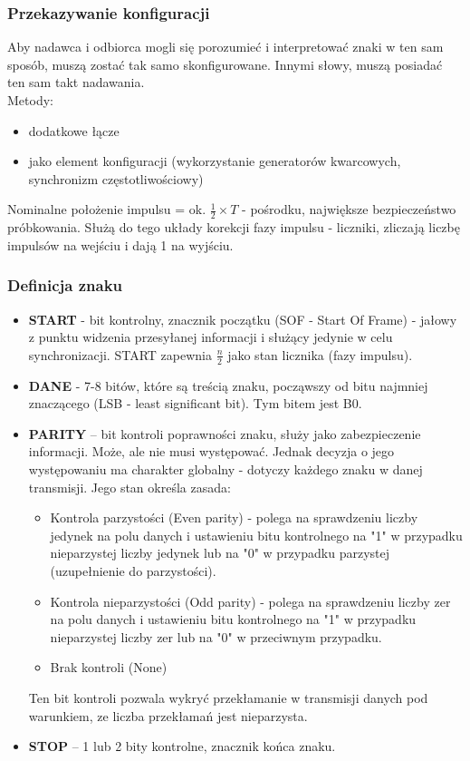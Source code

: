 \documentclass[a4paper,twoside]{article}
\begin{document}
		\subsubsection{Przekazywanie konfiguracji}
			Aby nadawca i odbiorca mogli się porozumieć i interpretować znaki w ten sam sposób, muszą zostać tak samo skonfigurowane. Innymi słowy, muszą posiadać ten sam takt nadawania.\\Metody:\\
			\begin{itemize}
				\item dodatkowe łącze
				\item jako element konfiguracji (wykorzystanie generatorów kwarcowych, synchronizm częstotliwościowy)
			\end{itemize}
			Nominalne położenie impulsu = ok. $\frac{1}{2}\times{T}$ - pośrodku, największe bezpieczeństwo próbkowania. Służą do tego układy korekcji fazy impulsu - liczniki, zliczają liczbę impulsów na wejściu i dają 1 na wyjściu.
		\subsubsection{Definicja znaku}
		\begin{itemize}
			\item \textbf{START} - bit kontrolny, znacznik początku (SOF - Start Of Frame) - jałowy z punktu widzenia przesyłanej informacji i służący jedynie w celu synchronizacji. START zapewnia $\frac{n}{2}$ jako stan licznika (fazy impulsu).
			\item \textbf{DANE} - 7-8 bitów, które są treścią znaku, począwszy od bitu najmniej znaczącego (LSB - least significant bit). Tym bitem jest B0.
			\item \textbf{PARITY} – bit kontroli poprawności znaku, służy jako zabezpieczenie informacji. Może, ale nie musi występować. Jednak decyzja o jego występowaniu ma charakter globalny - dotyczy każdego znaku w danej transmisji. Jego stan określa zasada:
			\begin{itemize}
				\item Kontrola parzystości (Even parity) - polega na sprawdzeniu liczby jedynek na polu danych i ustawieniu bitu kontrolnego na "1" w przypadku nieparzystej liczby jedynek lub na "0" w przypadku parzystej (uzupełnienie do parzystości).
				\item Kontrola nieparzystości (Odd parity) - polega na sprawdzeniu liczby zer na polu danych i ustawieniu bitu kontrolnego na "1" w przypadku nieparzystej liczby zer lub na "0" w przeciwnym przypadku.
				\item Brak kontroli (None)
			\end{itemize}
			Ten bit kontroli pozwala wykryć przekłamanie w transmisji danych pod warunkiem, ze liczba przekłamań jest nieparzysta.
			\item \textbf{STOP} – 1 lub 2 bity kontrolne, znacznik końca znaku.
		\end{itemize}
\end{document}
